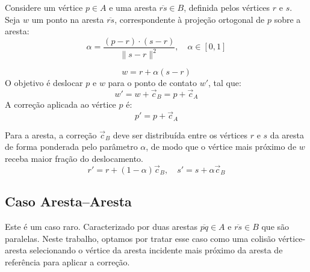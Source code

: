 Considere um vértice $p \in A$ e uma aresta $\overline{rs} \in B$, definida pelos vértices $r$ e $s$. Seja $w$ um ponto na aresta $\overline{rs}$, correspondente à projeção ortogonal de $p$ sobre a aresta:
$$
\alpha = \frac{(p - r) \cdot (s - r)}{\|s - r\|^2}, \quad \alpha \in [0,1]
$$

$$
w = r + \alpha (s - r)
$$
O objetivo é deslocar $p$ e $w$ para o ponto de contato $w'$, tal que:
$$
w' = w + \vec c_B = p + \vec c_A
$$
A correção aplicada ao vértice $p$ é:
$$
p' = p + \vec c_A
$$

Para a aresta, a correção $\vec c_B$ deve ser distribuída entre os vértices $r$ e $s$ da aresta de forma ponderada pelo parâmetro $\alpha$, de modo que o vértice mais próximo de $w$ receba maior fração do deslocamento.
$$
r' = r + (1 - \alpha)\vec c_B, \quad
s' = s + \alpha \vec c_B
$$

\subsection*{Caso Aresta--Aresta}

Este é um caso raro. Caracterizado por duas arestas $\overline{pq} \in A$ e $\overline{rs} \in B$ que são paralelas. Neste trabalho, optamos por tratar esse caso como uma colisão vértice-aresta selecionando o vértice da aresta incidente mais próximo da aresta de referência para aplicar a correção. 
